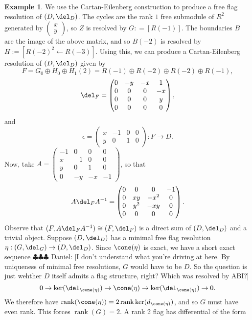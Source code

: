 \documentclass[12pt]{amsart}
\theoremstyle{definition}
\newtheorem{example}[lemma]{Example}
\theoremstyle{remark}
\newcommand{\daniel}[1]{{\color{blue} \sf $\clubsuit\clubsuit\clubsuit$ Daniel: [#1]}}
\def\on{\operatorname}
\begin{document}
\begin{example}
We use the Cartan-Eilenberg construction to produce a free flag resolution of $(D,\del_D)$.  The cycles are the rank $1$ free submodule of $R^2$ generated by $\begin{pmatrix} x \\ y \end{pmatrix}$, so $Z$ is resolved by $G: = [R(-1)]$.  The boundaries $B$ are the image of the above matrix, and so $B(-2)$ is resolved by $H:=[R(-2)^2 \gets R(-3)]$.  Using this, we can produce a Cartan-Eilenberg resolution
 of $(D, \del_D)$ given by
$$
F = G_0\oplus H_0 \oplus H_1(2) = R(-1) \oplus R(-2) \oplus R(-2) \oplus R(-1),
$$
$$
\del_F = \begin{pmatrix} 0 & -y & -x & 1 \\ 0 & 0 & 0 & -x \\ 0 & 0 & 0 & y \\ 0 & 0 & 0 & 0 \end{pmatrix},
$$
and
$$
\epsilon = \begin{pmatrix} x &  -1 & 0 & 0 \\ y & 0 & 1 & 0 \end{pmatrix}: F \to D.
$$
Now, take $A = \begin{pmatrix} -1 & 0 & 0 & 0 \\ x & -1 & 0 & 0 \\ y & 0 & 1 & 0 \\ 0 & -y & -x & -1\end{pmatrix}$, so that
$$
A \del_F A^{-1} = \begin{pmatrix} 0 & 0 & 0 & -1 \\ 0 & xy&-x^2&0 \\ 0 & y^2 & -xy&0 \\ 0 & 0 & 0 & 0 \end{pmatrix}.
$$
Observe that $(F, A\del_F A^{-1}) \cong (F, \del_F)$ is a direct sum of $(D, \del_D)$ and a trivial object.
\iffalse
Suppose $(D, \del_D)$ has a minimal free flag resolution $\eta : (G, \del_G) \to (D, \del_D)$. Since $\cone(\eta)$ is exact, we have a short exact sequence\daniel{I don't understand what you're driving at here.  By uniqueness of minimal free resolutions, $G$ would have to be $D$.  So the question is just wehther $D$ itself admits a flag structure, right?  Which was resolved by ABI?}
$$
0 \to \ker(\del_{{\cone}(\eta)}) \to \cone(\eta) \to \ker(\del_{{\cone}(\eta)}) \to 0.
$$
We therefore have $\on{rank}(\cone(\eta) ) = 2 \on{rank} \ker(d_{{\cone}(\eta)})  $, and so $G$ must have even rank. This forces $\on{rank}(G) = 2$. A rank 2 flag has differential of the form

\end{example}
\end{document}
